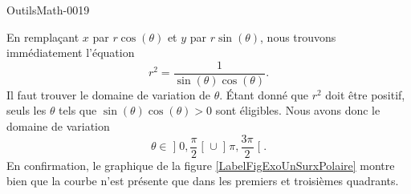 
\begin{corrige}{OutilsMath-0019}

	En remplaçant $x$ par $r\cos(\theta)$ et $y$ par $r\sin(\theta)$, nous trouvons immédiatement l'équation
	\begin{equation}
		r^2=\frac{1}{ \sin(\theta)\cos(\theta) }.
	\end{equation}
	Il faut trouver le domaine de variation de $\theta$. Étant donné que $r^2$ doit être positif, seuls les $\theta$ tels que $\sin(\theta)\cos(\theta)>0$ sont éligibles. Nous avons donc le domaine de variation
	\begin{equation}
		\theta\in\mathopen] 0 , \frac{ \pi }{2} \mathclose[\cup\mathopen] \pi , \frac{ 3\pi }{2} \mathclose[.
	\end{equation}
	En confirmation, le graphique de la figure \ref{LabelFigExoUnSurxPolaire} montre bien que la courbe n'est présente que dans les premiers et troisièmes quadrants.
	\newcommand{\CaptionFigExoUnSurxPolaire}{La fonction $y=1/x$.}
	


\end{corrige}
